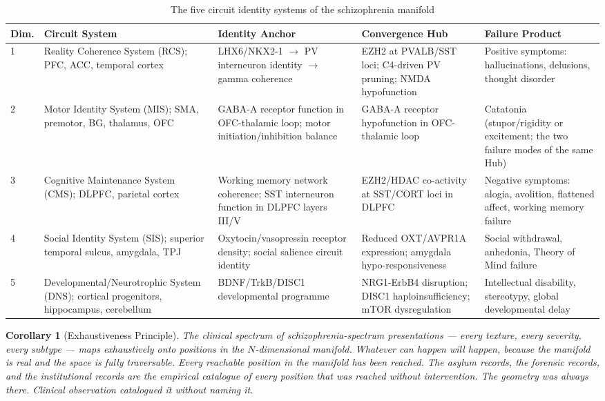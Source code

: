 \documentclass[12pt,a4paper]{article}
\newtheorem{corollary}{Corollary}
\begin{document}
\begin{table}[ht!]
\centering
\caption{The five circuit identity systems of the schizophrenia
  manifold}
\label{tab:circuits}
\begin{tabular}{p{0.5cm}p{2.8cm}p{2.5cm}p{2.5cm}p{2.8cm}}
\toprule
\textbf{Dim.} &
\textbf{Circuit System} &
\textbf{Identity Anchor} &
\textbf{Convergence Hub} &
\textbf{Failure Product} \\
\midrule
1 &
Reality Coherence System (RCS);
PFC, ACC, temporal cortex &
LHX6/NKX2-1 $\to$ PV interneuron
identity $\to$ gamma coherence &
EZH2 at PVALB/SST loci;
C4-driven PV pruning;
NMDA hypofunction &
Positive symptoms:
hallucinations, delusions,
thought disorder \\[4pt]
2 &
Motor Identity System (MIS);
SMA, premotor, BG, thalamus,
OFC &
GABA-A receptor function
in OFC-thalamic loop;
motor initiation/inhibition
balance &
GABA-A receptor hypofunction
in OFC-thalamic loop &
Catatonia (stupor/rigidity
or excitement;
the two failure modes
of the same Hub) \\[4pt]
3 &
Cognitive Maintenance System
(CMS); DLPFC, parietal cortex &
Working memory network
coherence;
SST interneuron function
in DLPFC layers III/V &
EZH2/HDAC co-activity
at SST/CORT loci in DLPFC &
Negative symptoms:
alogia, avolition,
flattened affect,
working memory failure \\[4pt]
4 &
Social Identity System (SIS);
superior temporal sulcus,
amygdala, TPJ &
Oxytocin/vasopressin
receptor density;
social salience
circuit identity &
Reduced OXT/AVPR1A
expression;
amygdala
hypo-responsiveness &
Social withdrawal, anhedonia,
Theory of Mind failure \\[4pt]
5 &
Developmental/Neurotrophic
System (DNS);
cortical progenitors,
hippocampus, cerebellum &
BDNF/TrkB/DISC1
developmental programme &
NRG1-ErbB4 disruption;
DISC1 haploinsufficiency;
mTOR dysregulation &
Intellectual disability,
stereotypy, global
developmental delay \\
\bottomrule
\end{tabular}
\end{table}

\begin{corollary}[Exhaustiveness Principle]
The clinical spectrum of schizophrenia-spectrum presentations
--- every texture, every severity, every subtype --- maps
exhaustively onto positions in the $N$-dimensional manifold.
Whatever can happen will happen, because the manifold is real
and the space is fully traversable. Every reachable position
in the manifold has been reached. The asylum records, the
forensic records, and the institutional records are the
empirical catalogue of every position that was reached
without intervention. The geometry was always there.
Clinical observation catalogued it without naming it.
\end{corollary}
\end{document}

